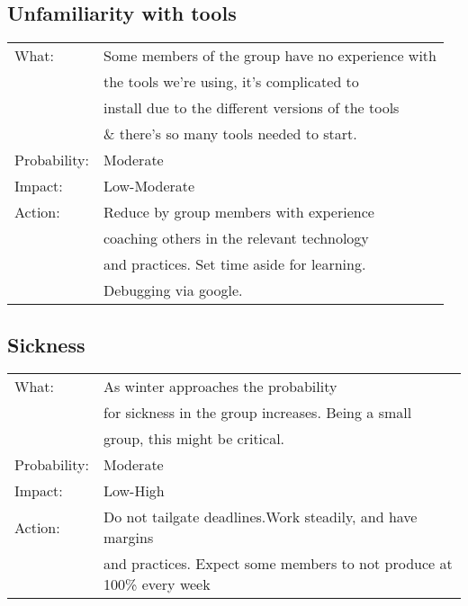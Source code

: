 \documentclass[12pt, a4paper]{article}
\begin{document}
\subsection{Unfamiliarity with tools}
\begin{tabular}{| l | l |}
	\hline
	What: & Some members of the group have no experience with\\
	& the tools we're using, it's complicated to\\
	& install due to the different versions of the tools \\
	& \& there's so many tools needed to start.\\
	\hline
	Probability: & Moderate \\
	\hline
	Impact: & Low-Moderate \\
	\hline
	Action: & Reduce by group members with experience \\
	& coaching others in the relevant technology\\
	& and practices. Set time aside for learning.\\
	& Debugging via google.\\
	\hline

\end{tabular}




\subsection{Sickness}
\begin{tabular}{| l | l |}
	\hline
	What: & As winter approaches the probability\\ 	&for sickness in the group increases. Being a small\\ 	&group, this might be critical.\\
	\hline
	Probability: & Moderate \\
	\hline
	Impact: & Low-High \\
	\hline
	Action: & Do not tailgate deadlines.Work steadily, and have margins\\
	&and practices. Expect some members to not produce at 100\% every week\\
	\hline

\end{tabular}
\end{document}
